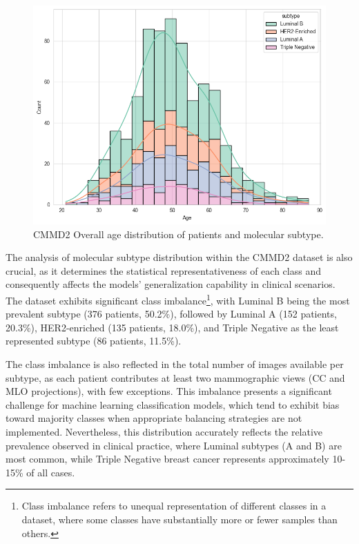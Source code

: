 \documentclass[a4paper,10pt]{book}
\begin{document}
\begin{figure}[h!]
	\centering
	\includegraphics[width=0.5\linewidth]{reports//assets/age_dist.png}
	\caption[CMMD2 Age distribution]{CMMD2 Overall age distribution of patients and molecular subtype.}
	\label{fig:age_dist_all}
\end{figure}

The analysis of molecular subtype distribution within the CMMD2 dataset is also crucial, as it determines the statistical representativeness of each class and consequently affects the models' generalization capability in clinical scenarios. The dataset exhibits significant class imbalance\footnote{Class imbalance refers to unequal representation of different classes in a dataset, where some classes have substantially more or fewer samples than others.}, with Luminal B being the most prevalent subtype (376 patients, 50.2\%), followed by Luminal A (152 patients, 20.3\%), HER2-enriched (135 patients, 18.0\%), and Triple Negative as the least represented subtype (86 patients, 11.5\%).

The class imbalance is also reflected in the total number of images available per subtype, as each patient contributes at least two mammographic views (CC and MLO projections), with few exceptions. This imbalance presents a significant challenge for machine learning classification models, which tend to exhibit bias toward majority classes when appropriate balancing strategies are not implemented. Nevertheless, this distribution accurately reflects the relative prevalence observed in clinical practice, where Luminal subtypes (A and B) are most common, while Triple Negative breast cancer represents approximately 10-15\% of all cases.
\end{document}
